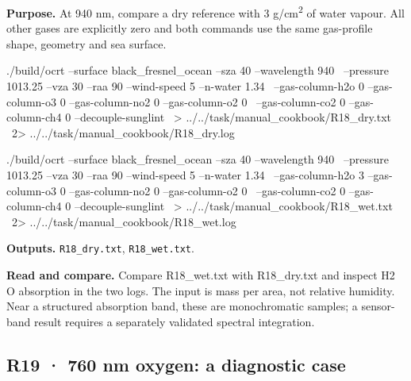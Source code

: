 \label{recipe:R18}

\textbf{Purpose. }At 940 nm, compare a dry reference with 3 g/cm\textsuperscript{2} of water vapour. All other gases are explicitly zero and both commands use the same gas-profile shape, geometry and sea surface.

\noindent\begin{minipage}{\linewidth}
\begin{ManualCode}

./build/ocrt --surface black_fresnel_ocean --sza 40 --wavelength 940 \
  --pressure 1013.25 --vza 30 --raa 90 --wind-speed 5 --n-water 1.34 \
  --gas-column-h2o 0 --gas-column-o3 0 --gas-column-no2 0 --gas-column-o2 0 \
  --gas-column-co2 0 --gas-column-ch4 0 --decouple-sunglint \
  > ../../task/manual_cookbook/R18_dry.txt \
  2> ../../task/manual_cookbook/R18_dry.log

\end{ManualCode}
\end{minipage}\par

\noindent\begin{minipage}{\linewidth}
\begin{ManualCode}

./build/ocrt --surface black_fresnel_ocean --sza 40 --wavelength 940 \
  --pressure 1013.25 --vza 30 --raa 90 --wind-speed 5 --n-water 1.34 \
  --gas-column-h2o 3 --gas-column-o3 0 --gas-column-no2 0 --gas-column-o2 0 \
  --gas-column-co2 0 --gas-column-ch4 0 --decouple-sunglint \
  > ../../task/manual_cookbook/R18_wet.txt \
  2> ../../task/manual_cookbook/R18_wet.log

\end{ManualCode}
\end{minipage}\par

\textbf{Outputs. }\texttt{R18\_\allowbreak{}dry.txt}, \texttt{R18\_\allowbreak{}wet.txt}.

\textbf{Read and compare. }Compare R18\_wet.txt with R18\_dry.txt and inspect H2 O absorption in the two logs. The input is mass per area, not relative humidity. Near a structured absorption band, these are monochromatic samples; a sensor-band result requires a separately validated spectral integration.

\Needspace{17\baselineskip}

\subsection{R19 · 760 nm oxygen: a diagnostic case}
\label{sec:auto:09_cookbook:4.4}

